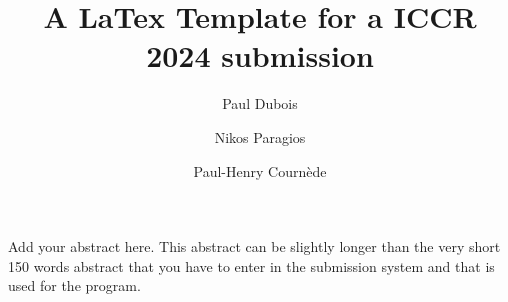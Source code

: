\documentclass[11pt,twocolumn,twoside]{article}
\begin{document}
\title{A LaTex Template for a ICCR 2024 submission} 

\author[1,2]{Paul Dubois}
\author[1]{Nikos Paragios}
\author[2]{Paul-Henry Cournède}



\maketitle
\thispagestyle{fancy}





\begin{customabstract}
Add your abstract here. This abstract can be slightly longer than the very short 150 words abstract that you have to enter in the submission system and that is used for the program. 
\end{customabstract}






\printbibliography
\end{document}
